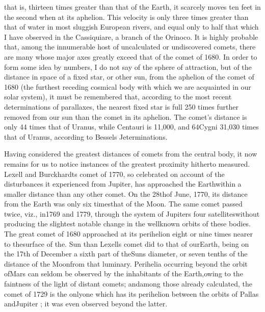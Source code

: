 that is, thirteen times greater than that of the Earth, it scarcely moves ten feet in the second when at its aphelion. This velocity is only three times greater than that of water in most sluggish European rivers, and equal only to half that which I have observed in the Cassiquiare, a branch of the Orinoco. It is highly probable that, among the innumerable host of uncalculated or undiscovered comets, there are many whose major axes greatly exceed that of the comet of 1680. In order to form some idea by numbers, I do not say of the sphere of attraction, but of the distance in space of a fixed star, or other sun, from the aphelion of the comet of 1680 (the furthest receding cosmical body with which we are acquainted in our solar system), it must be remembered that, according to the most recent determinations of parallaxes, the nearest fixed star is full 250 times further removed from our sun than the comet in its aphelion. The comet's distance is only 44 times that of Uranus, while  Centauri is 11,000, and 64Cygni 31,030 times that of Uranus, according to Bessels Jeterminations.

Having considered the greatest distances of comets from the central body, it now remains for us to notice instances of the greatest proximity hitherto measured. Lexell and Burckhardts comet of 1770, so celebrated on account of the disturbances it experienced from Jupiter, has approached the Earthwithin a smaller distance than any other comet. On the 28thof June, 1770, its distance from the Earth was only six timesthat of the Moon. The same comet passed twice, viz., in1769 and 1779, through the system of Jupiters four satelliteswithout producing the slightest notable change in the wellknown orbits of these bodies. The great comet of 1680 approached at its perihelion eight or nine times nearer to thesurface of the. Sun than Lexells comet did to that of ourEarth, being on the 17th of December a sixth part of theSuns diameter, or seven tenths of the distance of the Moonfrom that luminary. Perihelia occurring beyond the orbit ofMars can seldom be observed by the inhabitants of the Earth,owing to the faintness of the light of distant comets; andamong those already calculated, the comet of 1729 is the onlyone which has its perihelion between the orbits of Pallas andJupiter ; it was even observed beyond the latter.


